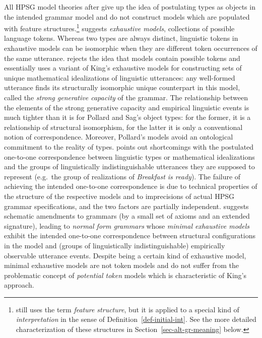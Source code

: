 \documentclass[output=paper
 	        ,biblatex
                ,babelshorthands
                ,newtxmath
                ,draftmode
                ,colorlinks, citecolor=brown
]{langscibook}
\begin{document}
{All HPSG model theories after  give up the idea of
postulating types as objects in the intended
grammar model and do not construct models which are populated with feature
structures.\footnote{\citet[294]{Pollard99a} still uses the term \emph{feature
    structure}, but it is applied to a special kind of \emph{interpretation}
  in the sense of Definition~\ref{def-initial-int}. See the
  more detailed characterization of these structures in
  Section~\ref{sec-alt-gr-meaning} below.} \citet{King99a-u} suggests \emph{exhaustive models},
collections of possible language tokens. Whereas two types are always
distinct, linguistic tokens in
exhaustive models can be isomorphic when they are different token
occurrences of the same utterance. \citet{Pollard99a} rejects the idea
that models contain possible tokens and essentially uses a variant of
King's exhaustive models for constructing sets of unique mathematical
idealizations of linguistic utterances: any well-formed utterance
finds its structurally isomorphic unique counterpart in this model,
called the \emph{strong generative capacity} of the grammar. The
relationship between the elements of the strong generative capacity
and empirical linguistic events is much tighter than it is for
Pollard and Sag's object types: for the former, it is a relationship
of structural isomorphism, for the latter it is only a conventional
notion of correspondence. Moreover, Pollard's models avoid an
ontological commitment to the reality of types. \citet{Richter2007a}
points out shortcomings with the postulated one-to-one correspondence
between linguistic types \citep{PollardSag1994} or mathematical
idealizations \citep{Pollard99a} and the groups of
linguistically indistinguishable utterances they
are supposed to represent (e.g.\ the group of realizations of
\emph{Breakfast is ready}). The failure of achieving the intended
one-to-one correspondence
is due to technical properties of the structure of the respective models
and to imprecisions of actual HPSG grammar
specifications, and the two factors are partially
independent. \citet{Richter2007a} suggests schematic amendments to
grammars (by a small set of axioms and an extended signature),
leading to \emph{normal form grammars} whose \emph{minimal exhaustive
  models} exhibit the intended one-to-one correspondence
between structural configurations in the model and (groups of linguistically
indistinguishable) empirically
observable utterance events. Despite being a certain kind of
exhaustive model, minimal exhaustive models are not token models and
do not suffer from the problematic concept of \emph{potential token} models
which is characteristic of King's approach.

}
\end{document}
